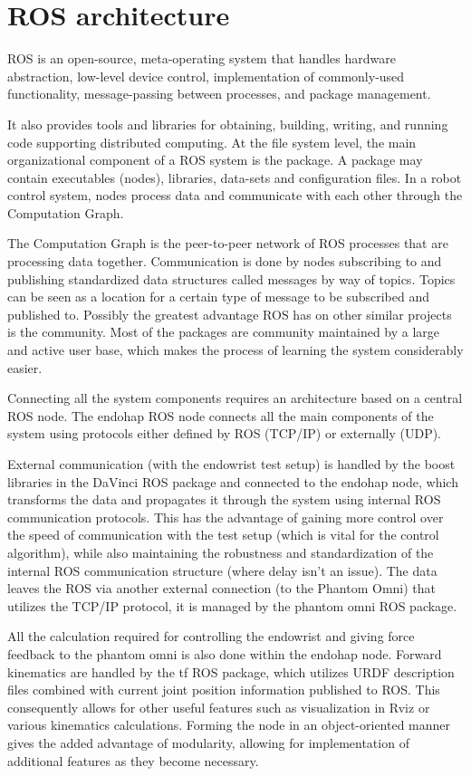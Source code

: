 \section{ROS architecture}

ROS is an open-source, meta-operating system that handles
hardware abstraction, low-level device control, implementation
of commonly-used functionality, message-passing between
processes, and package management.

 It also provides tools and libraries for obtaining, building, writing, and running code supporting distributed computing. At the file system level, the main organizational component of a ROS system
is the package. A package may contain executables (nodes),
libraries, data-sets and configuration files. In a robot control
system, nodes process data and communicate with each other
through the Computation Graph.

The Computation Graph is the peer-to-peer network of ROS
processes that are processing data together. Communication
is done by nodes subscribing to and publishing standardized
data structures called messages by way of topics. Topics can
be seen as a location for a certain type of message to be
subscribed and published to. Possibly the greatest advantage
ROS has on other similar projects is the community. Most of
the packages are community maintained by a large and active
user base, which makes the process of learning the system
considerably easier.

Connecting all the system components requires an architecture based on a central ROS node.
The endohap ROS node connects all the main components of the system using protocols either defined by ROS (TCP/IP) or externally (UDP).

External communication (with the endowrist test setup) is handled by the boost libraries in the DaVinci ROS package and connected to the endohap node, which transforms the data and propagates it through the system using internal ROS communication protocols. 
This has the advantage of gaining more control over the speed of communication with the test setup (which is vital for the control algorithm), while also maintaining the robustness and standardization of the internal ROS communication structure (where delay isn't an issue). The data leaves the ROS via another external connection (to the Phantom Omni) that utilizes the TCP/IP protocol, it is managed by the phantom omni ROS package.

All the calculation required for controlling the endowrist and giving force feedback to the phantom omni is also done within the endohap node. Forward kinematics are handled by the tf ROS package, which utilizes URDF description files combined with current joint position information published to ROS.
This consequently allows for other useful features such as visualization in Rviz or various kinematics calculations.
Forming the node in an object-oriented manner gives the added advantage of modularity, allowing for implementation of additional features as they become necessary. 

